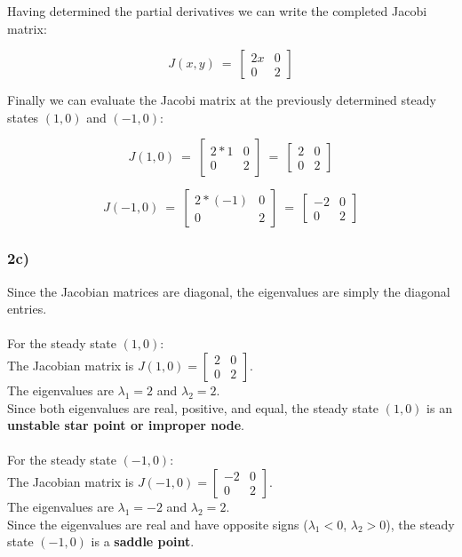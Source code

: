 \documentclass[]{scrartcl}
\begin{document}
Having determined the partial derivatives we can write the completed Jacobi matrix:

\[
J(x,y) ~=~
\begin{bmatrix}
  2x & 0 \\[1ex] %
  0 & 2
\end{bmatrix}
\]

Finally we can evaluate the Jacobi matrix at the previously determined steady states $(1,0)$ and $(-1,0)$:

\[
J(1,0) 
~=~
\begin{bmatrix}
  2*1 & 0 \\[1ex] %
  0 & 2
\end{bmatrix}
~=~
\begin{bmatrix}
  2 & 0 \\[1ex] %
  0 & 2
\end{bmatrix}
\]

\[
J(-1,0) 
~=~
\begin{bmatrix}
  2*(-1) & 0 \\[1ex] %
  0 & 2
\end{bmatrix}
~=~
\begin{bmatrix}
  -2 & 0 \\[1ex] %
  0 & 2
\end{bmatrix}
\]



\subsubsection*{2c)}

Since the Jacobian matrices are diagonal, the eigenvalues are simply the diagonal entries.
\\
\\
For the steady state $(1,0)$:
\\
The Jacobian matrix is $J(1,0) = \begin{bmatrix} 2 & 0 \\ 0 & 2 \end{bmatrix}$.
\\
The eigenvalues are $\lambda_1 = 2$ and $\lambda_2 = 2$.
\\
Since both eigenvalues are real, positive, and equal, the steady state $(1,0)$ is an \textbf{unstable star point or improper node}.
\\
\\
For the steady state $(-1,0)$:
\\
The Jacobian matrix is $J(-1,0) = \begin{bmatrix} -2 & 0 \\ 0 & 2 \end{bmatrix}$.
\\
The eigenvalues are $\lambda_1 = -2$ and $\lambda_2 = 2$.
\\
Since the eigenvalues are real and have opposite signs ($\lambda_1 < 0$, $\lambda_2 > 0$), the steady state $(-1,0)$ is a \textbf{saddle point}.
\end{document}
